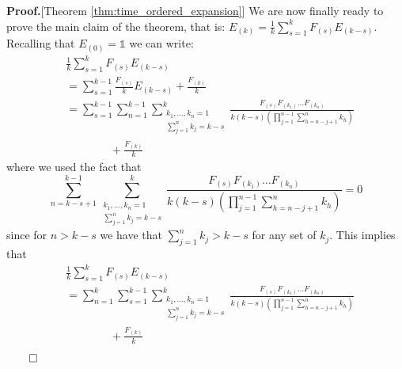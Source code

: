 \documentclass[twocolumn]{autart}    %
\newenvironment{proof}{\textbf{Proof.}}{\hfill $\qed$}
\newcommand{\one}{\mathbb{1}}
\begin{document}
\begin{proof}[Theorem \ref{thm:time_ordered_expansion}]
    We are now finally ready to prove the main claim of the theorem, that is: \(E_{(k)} = \frac{1}{k}\sum_{s=1}^{k}F_{(s)}E_{(k-s)}.\)
    Recalling that $E_{(0)}=\one$ we can write:
    \begin{align*}
        &\frac{1}{k}\sum_{s=1}^{k} F_{(s)} E_{(k-s)}\\  &= \sum_{s=1}^{k-1} \frac{F_{(s)}}{k} E_{(k-s)} + \frac{F_{(k)}}{k} \\&
        = \sum_{s=1}^{k-1}\sum_{n=1}^{k-1} \sum_{\substack{{k_1,\dots,k_{n} = 1}\\{\sum_{j=1}^{n}k_{j}=k-s}}}^{k} \frac{ F_{(s)} F_{(k_1)}\dots F_{(k_n)}}{k(k-s)(\prod_{j=1}^{n-1} \sum_{h=n-j+1}^n k_h)} \\&\qquad\qquad+ \frac{F_{(k)}}{k}  
    \end{align*}
    where we used the fact that \[\sum_{n=k-s+1}^{k-1} \sum_{\substack{{k_1,\dots,k_{n} = 1}\\{\sum_{j=1}^{n}k_{j}=k-s}}}^{k} \frac{ F_{(s)}F_{(k_1)}\dots F_{(k_n)}}{k(k-s)(\prod_{j=1}^{n-1} \sum_{h=n-j+1}^n k_h)} = 0\] since for $n>k-s$ we have that $\sum_{j=1}^{n}k_{j} > k-s$ for any set of $k_j$. This implies that
    \begin{align*}
        &\frac{1}{k}\sum_{s=1}^{k} F_{(s)}E_{(k-s)}  \\
        &= \sum_{n=1}^{k} \sum_{s=1}^{k-1} \sum_{\substack{{k_1,\dots,k_{n} = 1}\\{\sum_{j=1}^{n}k_{j}=k-s}}}^{k} \frac{F_{(s)} F_{(k_1)}\dots F_{(k_n)}}{k(k-s)(\prod_{j=1}^{n-1} \sum_{h=n-j+1}^n k_h)} \\&\qquad\qquad +\frac{F_{(k)}}{k} \\

\end{align*}
\end{proof}
\end{document}
